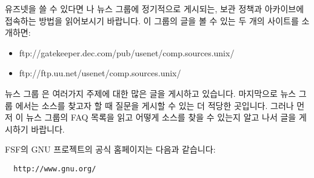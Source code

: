 \begin{faq}
	유즈넷을 쓸 수 있다면 나 
	뉴스 그룹에 정기적으로 게시되는, 보관 정책과 아카이브에 접속하는
	방법을 읽어보시기 바랍니다.  이 그룹의 글을 볼 수 있는 두 개의
	사이트를 소개하면:

	\begin{itemize}
	\item ftp://gatekeeper.dec.com/pub/usenet/comp.sources.unix/
	\item ftp://ftp.uu.net/usenet/comp.sources.unix/
	\end{itemize}

	뉴스 그룹 은 여러가지 주제에 대한 많은 글을
	게시하고 있습니다.  마지막으로 뉴스 그룹 에서는
	소스를 찾고자 할 때 질문을 게시할 수 있는 더 적당한 곳입니다.
	그러나 먼저 이 뉴스 그룹의 FAQ 목록을 읽고 어떻게 소스를 찾을 수
	있는지 알고 나서 글을 게시하기 바랍니다.


\T
	FSF의 GNU 프로젝트의 공식 홈페이지는 다음과 같습니다:
\begin{verbatim}
  http://www.gnu.org/
\end{verbatim}

\end{faq}

%
%
